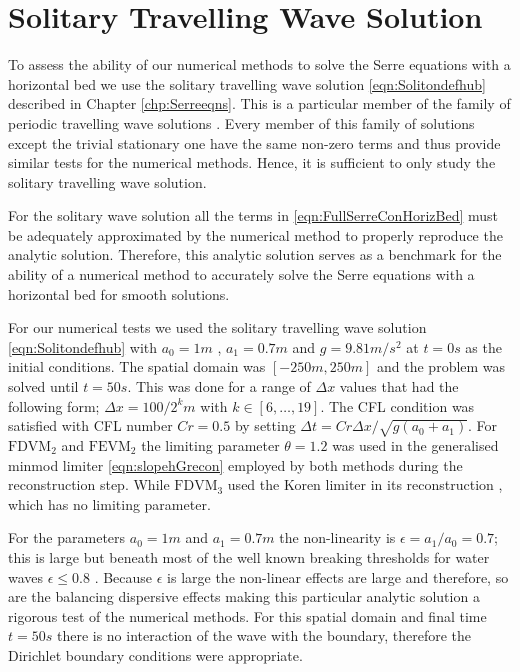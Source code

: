 \section{Solitary Travelling Wave Solution}
To assess the ability of our numerical methods to solve the Serre equations with a horizontal bed we use the solitary travelling wave solution \eqref{eqn:Solitondefhub} described in Chapter \ref{chp:Serreeqns}. This is a particular member of the family of periodic travelling wave solutions \cite{El-etal-2006}. Every member of this family of solutions except the trivial stationary one have the same non-zero terms and thus provide similar tests for the numerical methods. Hence, it is sufficient to only study the solitary travelling wave solution.

For the solitary wave solution all the terms in \eqref{eqn:FullSerreConHorizBed} must be adequately approximated by the numerical method to properly reproduce the analytic solution. Therefore, this analytic solution serves as a benchmark for the ability of a numerical method to accurately solve the Serre equations with a horizontal bed for smooth solutions.

For our numerical tests we used the solitary travelling wave solution \eqref{eqn:Solitondefhub} with $a_0 = 1m$ , $a_1 = 0.7m$ and $g= 9.81m/s^2$ at $t=0s$ as the initial conditions. The spatial domain was $[-250m,250m]$ and the problem was solved until $t= 50s$. This was done for a range of $\Delta x$ values that had the following form; $\Delta x = 100 / 2^k m$ with $k \in \left[6,\dots,19\right]$. The CFL condition was satisfied with CFL number $Cr = 0.5$ by setting $\Delta t = Cr \Delta x / \sqrt{g\left(a_0 + a_1\right)}$. For $\text{FDVM}_2$ and $\text{FEVM}_2$ the limiting parameter $\theta = 1.2$ was used in the generalised minmod limiter \eqref{eqn:slopehGrecon} employed by both methods during the reconstruction step. While $\text{FDVM}_3$ used the Koren limiter \cite{Koren-93} in its reconstruction \cite{Zoppou-etal-2017}, which has no limiting parameter. 

For the parameters $a_0 = 1m$ and $a_1 = 0.7m$ the non-linearity is $\epsilon = a_1 / a_0 = 0.7$; this is large but beneath most of the well known breaking thresholds for water waves $\epsilon \le 0.8$ \cite{Ippen-Kulin-1954-4}. Because $\epsilon$ is large the non-linear effects are large and therefore, so are the balancing dispersive effects making this particular analytic solution a rigorous test of the numerical methods. For this spatial domain and final time $t=50s$ there is no interaction of the wave with the boundary, therefore the Dirichlet boundary conditions were appropriate.

